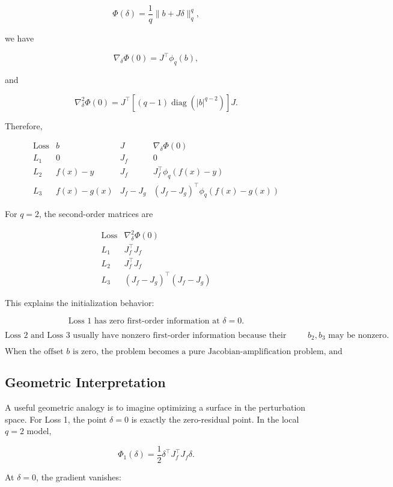 \documentclass{article}
\begin{document}
\[
\Phi(\delta)
=
\frac{1}{q}\|b+J\delta\|_q^q,
\]

we have

\[
\nabla_\delta\Phi(0)
=
J^\top\phi_q(b),
\]

and

\[
\nabla_\delta^2\Phi(0)
=
J^\top
\left[
(q-1)\operatorname{diag}(|b|^{q-2})
\right]
J.
\]

Therefore,

\[
\begin{array}{c|c|c|c}
\text{Loss} & b & J & \nabla_\delta\Phi(0)\\
\hline
L_1 & 0 & J_f & 0\\
L_2 & f(x)-y & J_f & J_f^\top\phi_q(f(x)-y)\\
L_3 & f(x)-g(x) & J_f-J_g
&
(J_f-J_g)^\top\phi_q(f(x)-g(x))
\end{array}
\]

For \(q=2\), the second-order matrices are

\[
\begin{array}{c|c}
\text{Loss} & \nabla_\delta^2\Phi(0)\\
\hline
L_1 & J_f^\top J_f\\
L_2 & J_f^\top J_f\\
L_3 & (J_f-J_g)^\top(J_f-J_g)
\end{array}
\]

This explains the initialization behavior:

\[
\boxed{
\text{Loss 1 has zero first-order information at } \delta=0.
}
\]

\[
\boxed{
\text{Loss 2 and Loss 3 usually have nonzero first-order information because their offsets } b_2,b_3 \text{ may be nonzero.}
}
\]

\[
\boxed{
\text{When the offset } b \text{ is zero, the problem becomes a pure Jacobian-amplification problem, and initialization becomes critical.}
}
\]

\subsection{Geometric Interpretation}

A useful geometric analogy is to imagine optimizing a surface in the perturbation space. For Loss 1, the point \(\delta=0\) is exactly the zero-residual point. In the local \(q=2\) model,

\[
\Phi_1(\delta)
=
\frac{1}{2}\delta^\top J_f^\top J_f\delta.
\]

At \(\delta=0\), the gradient vanishes:
\end{document}
